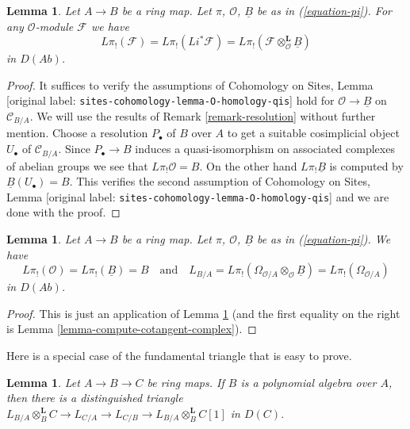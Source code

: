 \documentclass[10pt,a4paper]{article}
\theoremstyle{plain}
\newtheorem{lemma}[subsection]{Lemma}
\theoremstyle{definition}
\theoremstyle{remark}
\numberwithin{equation}{subsection}
\begin{document}
\begin{lemma}
\label{lemma-O-homology-B-homology}
Let $A \to B$ be a ring map. Let $\pi$, $\mathcal{O}$, $\underline{B}$
be as in (\ref{equation-pi}). For any $\mathcal{O}$-module $\mathcal{F}$
we have
$$
L\pi_!(\mathcal{F}) = L\pi_!(Li^*\mathcal{F}) =
L\pi_!(\mathcal{F} \otimes_\mathcal{O}^\mathbf{L} \underline{B})
$$
in $D(\textit{Ab})$.
\end{lemma}

\begin{proof}
It suffices to verify the assumptions of Cohomology on Sites, Lemma
\textnormal{[original label: \nolinkurl{sites-cohomology-lemma-O-homology-qis}]}
hold for $\mathcal{O} \to \underline{B}$ on $\mathcal{C}_{B/A}$.
We will use the results of Remark \ref{remark-resolution} without
further mention. Choose a resolution $P_\bullet$ of $B$ over $A$ to get a
suitable cosimplicial object $U_\bullet$ of $\mathcal{C}_{B/A}$.
Since $P_\bullet \to B$ induces a quasi-isomorphism on associated
complexes of abelian groups we see that $L\pi_!\mathcal{O} = B$.
On the other hand $L\pi_!\underline{B}$ is computed by
$\underline{B}(U_\bullet) = B$. This verifies the second assumption of
Cohomology on Sites, Lemma
\textnormal{[original label: \nolinkurl{sites-cohomology-lemma-O-homology-qis}]}
and we are done with the proof.
\end{proof}

\begin{lemma}
\label{lemma-apply-O-B-comparison}
Let $A \to B$ be a ring map. Let $\pi$, $\mathcal{O}$, $\underline{B}$
be as in (\ref{equation-pi}). We have
$$
L\pi_!(\mathcal{O}) = L\pi_!(\underline{B}) = B
\quad\text{and}\quad
L_{B/A} = L\pi_!(\Omega_{\mathcal{O}/A} \otimes_\mathcal{O} \underline{B}) =
L\pi_!(\Omega_{\mathcal{O}/A})
$$
in $D(\textit{Ab})$.
\end{lemma}

\begin{proof}
This is just an application of Lemma \ref{lemma-O-homology-B-homology}
(and the first equality on the right is
Lemma \ref{lemma-compute-cotangent-complex}).
\end{proof}

\noindent
Here is a special case of the fundamental triangle that is easy to prove.

\begin{lemma}
\label{lemma-special-case-triangle}
Let $A \to B \to C$ be ring maps. If $B$ is a polynomial algebra over
$A$, then there is a distinguished triangle 
$L_{B/A} \otimes_B^\mathbf{L} C \to L_{C/A} \to L_{C/B} \to
L_{B/A} \otimes_B^\mathbf{L} C[1]$ in $D(C)$.
\end{lemma}
\end{document}
